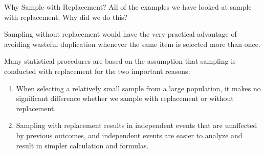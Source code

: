 \documentclass{beamer}
\begin{document}
\begin{frame}
\begin{block}{Why Sample with Replacement?}
All of the examples we have looked at sample with replacement. Why did we do this?\pause

\vspace{2mm}
Sampling without replacement would have the very practical advantage of avoiding wasteful duplication whenever the same item is selected more than once.\pause

\vspace{2mm}
Many statistical procedures are based on the assumption that sampling is conducted with replacement for the two important reasons:\pause
\begin{enumerate}
\item When selecting a relatively small sample from a large population, it makes no significant difference whether we sample with replacement or without replacement.\pause
\item Sampling with replacement results in independent events that are unaffected by previous outcomes, and independent events are easier to analyze and result in simpler calculation and formulas.
\end{enumerate}
\end{block}
\end{frame}
\end{document}
